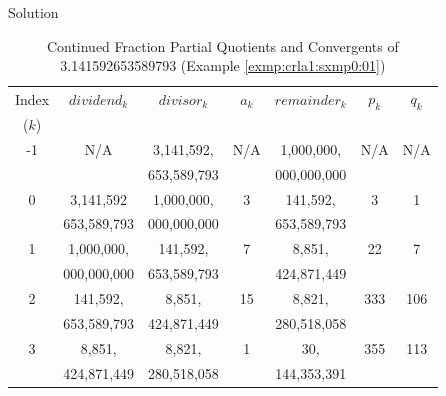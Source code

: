 \begin{vworkexampleparsection}{Solution}
\begin{table}
\caption{Continued Fraction Partial Quotients and Convergents of 3.141592653589793 (Example \ref{exmp:crla1:sxmp0:01})}
\label{tbl:crla1:sxmp0:01}
\begin{center}
\begin{tabular}{|c|c|c|c|c|c|c|}
\hline
\small{Index} & \small{$dividend_k$}      & \small{$divisor_k$}        & \small{$a_k$}   & \small{$remainder_k$}   & \small{$p_k$}      & \small{$q_k$}       \\
\small{($k$)} &                           &                            &                 &                         &                    &                     \\
\hline
\hline
\small{-1}    & \small{N/A}               & \small{3,141,592,}         & \small{N/A}     & \small{1,000,000,}      & \small{N/A}        & \small{N/A}         \\
              &                           & \small{653,589,793}        &                 & \small{000,000,000}     &                    &                     \\
\hline
\small{0}     &  \small{3,141,592}        & \small{1,000,000,}         & \small{3}       & \small{141,592,}        & \small{3}          & \small{1}           \\
              & \small{653,589,793}       & \small{000,000,000}        &                 & \small{653,589,793}     &                    &                     \\
\hline
\small{1}     & \small{1,000,000,}        & \small{141,592,}           & \small{7}       & \small{8,851,}          & \small{22}         & \small{7}           \\
              & \small{000,000,000}       & \small{653,589,793}        &                 & \small{424,871,449}     &                    &                     \\
\hline
\small{2}     & \small{141,592,}          & \small{8,851,}             & \small{15}      & \small{8,821,}          & \small{333}        & \small{106}         \\
              & \small{653,589,793}       & \small{424,871,449}        &                 & \small{280,518,058}     &                    &                     \\
\hline
\small{3}     & \small{8,851,}            & \small{8,821,}             & \small{1}       & \small{30,}             & \small{355}        & \small{113}         \\
              & \small{424,871,449}       & \small{280,518,058}        &                 & \small{144,353,391}     &                    &                     \\

\end{tabular}
\end{center}
\end{table}
\end{vworkexampleparsection}

